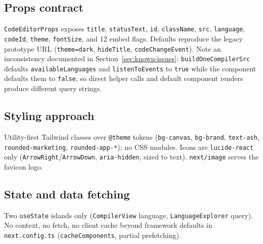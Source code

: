 \subsection{Props contract}
\texttt{CodeEditorProps} exposes \texttt{title}, \texttt{statusText}, \texttt{id}, \texttt{className}, \texttt{src}, \texttt{language}, \texttt{codeId}, \texttt{theme}, \texttt{fontSize}, and 12 embed flags. Defaults reproduce the legacy prototype URL (\texttt{theme=dark}, \texttt{hideTitle}, \texttt{codeChangeEvent}). Note an inconsistency documented in Section~\ref{sec:known-issues}: \texttt{buildOneCompilerSrc} defaults \texttt{availableLanguages} and \texttt{listenToEvents} to \texttt{true} while the component defaults them to \texttt{false}, so direct helper calls and default component renders produce different query strings.

\subsection{Styling approach}
Utility-first Tailwind classes over \texttt{@theme} tokens (\texttt{bg-canvas}, \texttt{bg-brand}, \texttt{text-ash}, \texttt{rounded-marketing}, \texttt{rounded-app-*}); no CSS modules. Icons are \texttt{lucide-react} only (\texttt{ArrowRight}/\texttt{ArrowDown}, \texttt{aria-hidden}, sized to text). \texttt{next/image} serves the favicon logo.

\subsection{State and data fetching}
Two \texttt{useState} islands only (\texttt{CompilerView} language, \texttt{LanguageExplorer} query). No context, no fetch, no client cache beyond framework defaults in \texttt{next.config.ts} (\texttt{cacheComponents}, partial prefetching).
